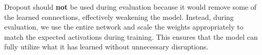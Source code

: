\begin{parts}
\begin{subparts}
{                Dropout should \textbf{not} be used during evaluation because it would remove some of the learned
                connections, effectively weakening the model. Instead, during evaluation, we use the entire network
                and scale the weights appropriately to match the expected activations during training. This ensures
                that the model can fully utilize what it has learned without unnecessary disruptions.

            }
         
        \end{subparts}


\end{parts}
